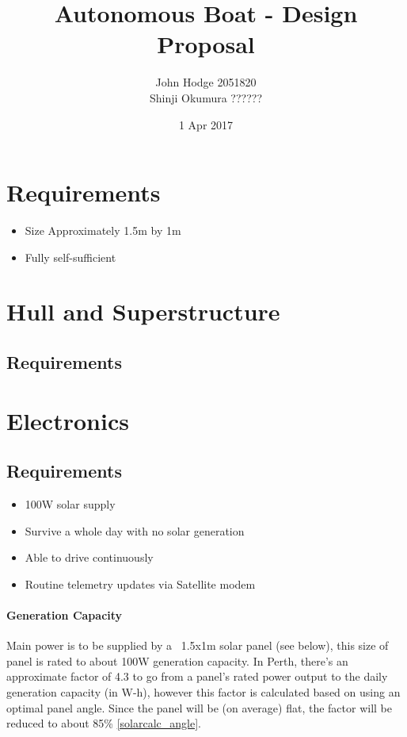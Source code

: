 
\title{Autonomous Boat - Design Proposal}
\author{John Hodge 2051820 \\ Shinji Okumura ??????}
\date{1 Apr 2017}

\maketitle

\section{Requirements}
\begin{itemize}
\item{Size} Approximately 1.5m by 1m
\item Fully self-sufficient
\end{itemize}

%
%
\section{Hull and Superstructure}
\subsection{Requirements}


%
%
\section{Electronics}

\subsection{Requirements}

\begin{itemize}
\item 100W solar supply
\item Survive a whole day with no solar generation
\item Able to drive continuously
\item Routine telemetry updates via Satellite modem
\end{itemize}

\paragraph{Generation Capacity}
Main power is to be supplied by a ~1.5x1m solar panel (see below), this size of panel is rated to about 100W generation capacity. In Perth, there's an approximate factor of 4.3 to go from a panel's rated power output to the daily generation capacity (in W-h), however this factor is calculated based on using an optimal panel angle. Since the panel will be (on average) flat, the factor will be reduced to about 85\% \ref{solarcalc_angle}.

